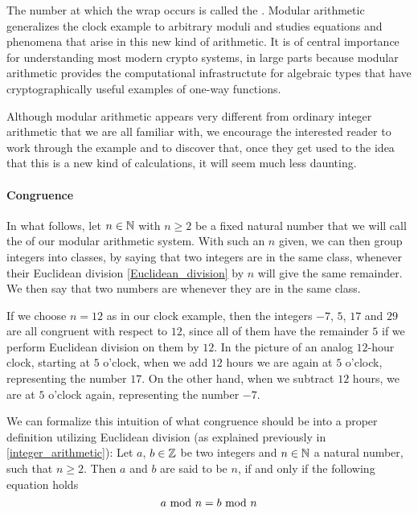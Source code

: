 The number at which the wrap occurs is called the . Modular arithmetic generalizes the clock example to arbitrary moduli and studies equations and phenomena that arise in this new kind of arithmetic. It is of central importance for understanding most modern crypto systems, in large parts because modular arithmetic provides the computational infrastructute for algebraic types that have cryptographically useful examples of one-way functions.

Although modular arithmetic appears very different from ordinary integer arithmetic that we are all familiar with, we encourage the interested reader to work through the example and to discover that, once they get used to the idea that this is a new kind of calculations, it will seem much less daunting.

\paragraph{Congruence}
In what follows, let $n\in\mathbb{N}$ with $n\geq 2$ be a fixed natural number that we will call the  of our modular arithmetic system. With such an $n$ given, we can then group integers into classes, by saying that two integers are in the same class, whenever their Euclidean division \ref{Euclidean_division} by $n$ will give the same remainder. We then say that two numbers are  whenever they are in the same class.

\begin{example}
If we choose $n=12$ as in our clock example, then the integers $-7$, $5$, $17$ and $29$ are all congruent with respect to $12$, since all of them have the remainder $5$ if we perform Euclidean division on them by $12$. In the picture of an analog $12$-hour clock, starting at $5$ o'clock, when we add $12$ hours we are again at $5$ o'clock, representing the number $17$. On the other hand, when we subtract $12$ hours, we are at $5$ o'clock again, representing the number $-7$.
\end{example}
We can formalize this intuition of what congruence should be into a proper definition utilizing Euclidean division (as explained previously in \ref{integer_arithmetic}): Let $ a $, $ b \in \mathbb{Z} $ be two integers and $ n \in \mathbb{N} $ a natural number, such that $n\geq 2$. Then $ a $ and $ b $ are said to be  $ n $, if and only if the following equation holds
\begin{equation}
a \text{ mod } n = b \text{ mod } n
\end{equation}

